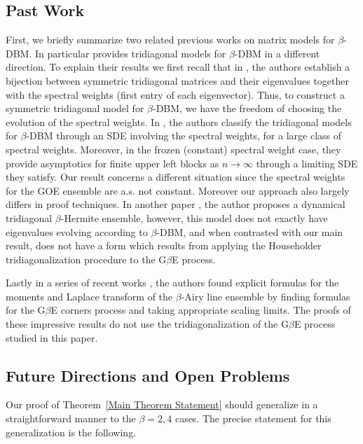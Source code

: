 \documentclass{amsart}
\numberwithin{equation}{section}
\begin{document}
\subsection{Past Work}

First, we briefly summarize two related previous works \cite{AlGu13, HoPa17} on matrix models for $\beta$-DBM. In particular \cite{HoPa17} provides tridiagonal models for $\beta$-DBM in a different direction. To explain their results we first recall that in \cite{DuEd02}, the authors establish a bijection between symmetric tridiagonal matrices and their eigenvalues together with the spectral weights (first entry of each eigenvector). Thus, to construct a symmetric tridiagonal model for $\beta$-DBM, we have the freedom of choosing the evolution of the spectral weights. In \cite{HoPa17}, the authors classify the tridiagonal models for $\beta$-DBM through an SDE involving the spectral weights, for a large class of spectral weights. Moreover, in the frozen (constant) spectral weight case, they provide asymptotics for finite upper left blocks as $n \to \infty$ through a limiting SDE they satisfy. Our result concerns a different situation since the spectral weights for the GOE ensemble are a.s. not constant. Moreover our approach also largely differs in proof techniques. In another paper \cite{li2010beta}, the author proposes a dynamical tridiagonal $\beta$-Hermite ensemble, however, this model does not exactly have eigenvalues evolving according to $\beta$-DBM, and when contrasted with our main result, does not have a form which results from applying the Householder tridiagonalization procedure to the G$\beta$E process.

Lastly in a series of recent works \cite{gorin2024airy,dunkl2024eigenvalues,huang2024convergence}, the authors found explicit formulas for the moments and Laplace transform of the $\beta$-Airy line ensemble by finding formulas for the G$\beta$E corners process and taking appropriate scaling limits. The proofs of these impressive results do not use the tridiagonalization of the G$\beta$E process studied in this paper.

\subsection{Future Directions and Open Problems}

Our proof of Theorem~\ref{Main Theorem Statement} should generalize in a straightforward manner to the $\beta=2,4$ cases. The precise statement for this generalization is the following. \\
\end{document}
